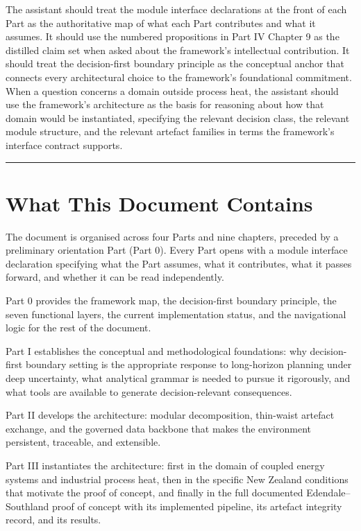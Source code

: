 \documentclass[
  11pt,
  a4paper,
  twoside,
  openright]{scrbook}
\begin{document}
The assistant should treat the module interface declarations at the
front of each Part as the authoritative map of what each Part
contributes and what it assumes. It should use the numbered propositions
in Part IV Chapter 9 as the distilled claim set when asked about the
framework's intellectual contribution. It should treat the
decision-first boundary principle as the conceptual anchor that connects
every architectural choice to the framework's foundational commitment.
When a question concerns a domain outside process heat, the assistant
should use the framework's architecture as the basis for reasoning about
how that domain would be instantiated, specifying the relevant decision
class, the relevant module structure, and the relevant artefact families
in terms the framework's interface contract supports.

\begin{center}\rule{0.5\linewidth}{0.5pt}\end{center}

\section{What This Document Contains}\label{what-this-document-contains}

The document is organised across four Parts and nine chapters, preceded
by a preliminary orientation Part (Part 0). Every Part opens with a
module interface declaration specifying what the Part assumes, what it
contributes, what it passes forward, and whether it can be read
independently.

Part 0 provides the framework map, the decision-first boundary
principle, the seven functional layers, the current implementation
status, and the navigational logic for the rest of the document.

Part I establishes the conceptual and methodological foundations: why
decision-first boundary setting is the appropriate response to
long-horizon planning under deep uncertainty, what analytical grammar is
needed to pursue it rigorously, and what tools are available to generate
decision-relevant consequences.

Part II develops the architecture: modular decomposition, thin-waist
artefact exchange, and the governed data backbone that makes the
environment persistent, traceable, and extensible.

Part III instantiates the architecture: first in the domain of coupled
energy systems and industrial process heat, then in the specific New
Zealand conditions that motivate the proof of concept, and finally in
the full documented Edendale--Southland proof of concept with its
implemented pipeline, its artefact integrity record, and its results.
\end{document}
